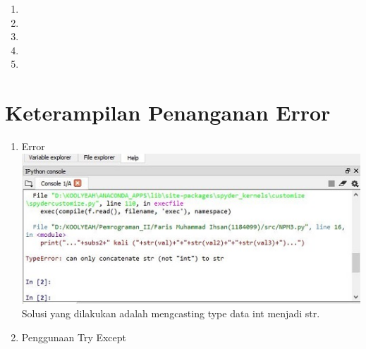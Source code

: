 \begin{enumerate}
\begin{enumerate}
\item


\item


\item


\item


\item


\end{enumerate}

\section{Keterampilan Penanganan Error}
\begin{enumerate}

\item Error\\
\includegraphics{gambar/2errpy.jpg}
Solusi yang dilakukan adalah mengcasting type data int menjadi str.

\item Penggunaan Try Except\\


\end{enumerate}
\end{enumerate}